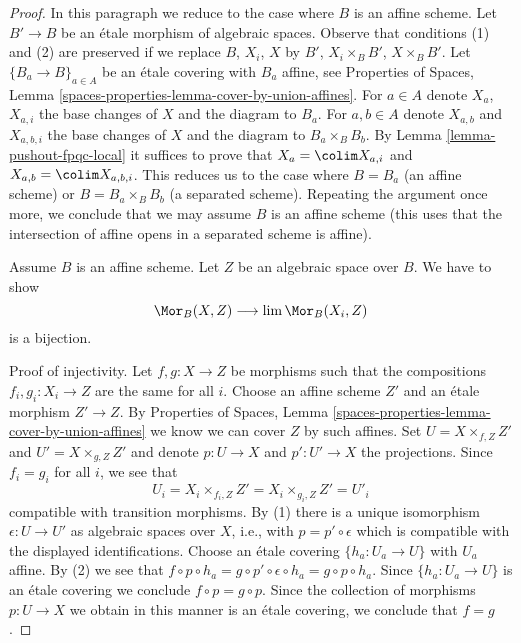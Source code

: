 \begin{proof}
In this paragraph we reduce to the case where $B$ is an affine scheme.
Let $B' \to B$ be an \'etale morphism of algebraic spaces.
Observe that conditions (1) and (2) are preserved if we replace
$B$, $X_i$, $X$ by $B'$, $X_i \times_B B'$, $X \times_B B'$.
Let $\{B_a \to B\}_{a \in A}$ be an \'etale covering with $B_a$
affine, see Properties of Spaces, Lemma
\ref{spaces-properties-lemma-cover-by-union-affines}.
For $a \in A$ denote $X_a$, $X_{a, i}$ the base changes of $X$ and the
diagram to $B_a$. For $a, b \in A$ denote
$X_{a, b}$ and $X_{a, b, i}$ the base changes of $X$ and the
diagram to $B_a \times_B B_b$.
By Lemma \ref{lemma-pushout-fpqc-local}
it suffices to prove that $X_a = \colim X_{a, i}$ and
$X_{a, b} = \colim X_{a, b, i}$.
This reduces us to the case where $B = B_a$ (an affine scheme) or
$B = B_a \times_B B_b$ (a separated scheme). Repeating the
argument once more, we conclude that we may assume $B$ is
an affine scheme (this uses that the intersection of affine
opens in a separated scheme is affine).

\medskip\noindent
Assume $B$ is an affine scheme. Let $Z$ be an algebraic space over $B$.
We have to show
$$
\Mor_B(X, Z) \longrightarrow \lim \Mor_B(X_i, Z)
$$
is a bijection.

\medskip\noindent
Proof of injectivity. Let $f, g : X \to Z$ be morphisms
such that the compositions $f_i, g_i : X_i \to Z$ are the same for all $i$.
Choose an affine scheme $Z'$ and an \'etale morphism $Z' \to Z$. By
Properties of Spaces, Lemma \ref{spaces-properties-lemma-cover-by-union-affines}
we know we can cover $Z$ by such affines. Set $U = X \times_{f, Z} Z'$
and $U' = X \times_{g, Z} Z'$ and denote $p : U \to X$ and $p' : U' \to X$
the projections. Since $f_i = g_i$ for all $i$, we see that
$$
U_i = X_i \times_{f_i, Z} Z' = X_i \times_{g_i, Z} Z' = U'_i
$$
compatible with transition morphisms. By (1) there is a unique isomorphism
$\epsilon : U \to U'$ as algebraic spaces over $X$, i.e., with
$p = p' \circ \epsilon$ which is compatible with
the displayed identifications. Choose an \'etale covering
$\{h_a : U_a \to U\}$ with $U_a$ affine.
By (2) we see that $f \circ p \circ h_a = g \circ p' \circ \epsilon \circ h_a =
g \circ p \circ h_a$. Since $\{h_a : U_a \to U\}$ is an \'etale covering
we conclude $f \circ p = g \circ p$.
Since the collection of morphisms $p : U \to X$ we obtain
in this manner is an \'etale covering, we conclude that $f = g$.


\end{proof}
